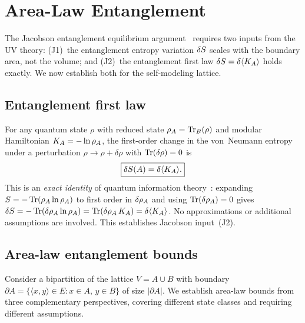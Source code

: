 \section{Area-Law Entanglement}
\label{sec:arealaw}

The Jacobson entanglement equilibrium argument~\cite{Jacobson2016}
requires two inputs from the UV theory: (J1)~the entanglement entropy
variation $\delta S$ scales with the boundary area, not the volume;
and (J2)~the entanglement first law
$\delta S = \delta\langle K_A\rangle$ holds exactly.  We now
establish both for the self-modeling lattice.

\subsection{Entanglement first law}
\label{sec:first-law}

For any quantum state $\rho$ with reduced state
$\rho_A = \operatorname{Tr}_B(\rho)$ and modular Hamiltonian
$K_A = -\ln \rho_A$, the first-order change in the von~Neumann
entropy under a perturbation $\rho \to \rho + \delta\rho$ with
$\operatorname{Tr}(\delta\rho) = 0$ is
\begin{equation}
  \boxed{\delta S(A) = \delta\langle K_A \rangle.}
  \label{eq:first-law}
\end{equation}
This is an \emph{exact identity} of quantum information
theory~\cite{BCHM2013, LMVR2014}: expanding
$S = -\operatorname{Tr}(\rho_A \ln \rho_A)$ to first order in $\delta\rho_A$ and
using $\operatorname{Tr}(\delta\rho_A) = 0$ gives
$\delta S = -\operatorname{Tr}(\delta\rho_A \ln\rho_A) = \operatorname{Tr}(\delta\rho_A \, K_A)
= \delta\langle K_A\rangle$.  No approximations or additional
assumptions are involved.  This establishes Jacobson
input~(J2).

\subsection{Area-law entanglement bounds}
\label{sec:area-bounds}

Consider a bipartition of the lattice $V = A \cup B$ with boundary
$\partial A = \{\langle x,y \rangle \in E : x \in A,\, y \in B\}$ of
size $|\partial A|$.  We establish area-law bounds from three
complementary perspectives, covering different state classes and
requiring different assumptions.

